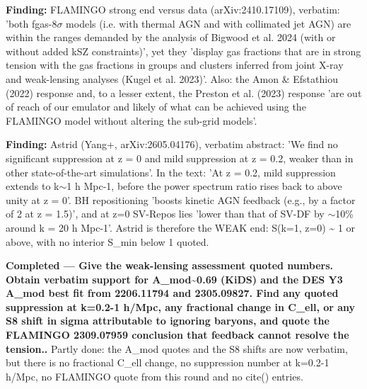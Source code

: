 \documentclass[11pt,a4paper]{article}
\begin{document}
\textbf{Finding:} FLAMINGO strong end versus data (arXiv:2410.17109), verbatim: 'both fgas-8$\sigma$ models (i.e. with thermal AGN and with collimated jet AGN) are within the ranges demanded by the analysis of Bigwood et al. 2024 (with or without added kSZ constraints)', yet they 'display gas fractions that are in strong tension with the gas fractions in groups and clusters inferred from joint X-ray and weak-lensing analyses (Kugel et al. 2023)'. Also: the Amon \& Efstathiou (2022) response and, to a lesser extent, the Preston et al. (2023) response 'are out of reach of our emulator and likely of what can be achieved using the FLAMINGO model without altering the sub-grid models'.

\textbf{Finding:} Astrid (Yang+, arXiv:2605.04176), verbatim abstract: 'We find no significant suppression at z = 0 and mild suppression at z = 0.2, weaker than in other state-of-the-art simulations'. In the text: 'At z = 0.2, mild suppression extends to k$\sim$1 h Mpc-1, before the power spectrum ratio rises back to above unity at z = 0'. BH repositioning 'boosts kinetic AGN feedback (e.g., by a factor of 2 at z = 1.5)', and at z=0 SV-Repos lies 'lower than that of SV-DF by $\sim$10\% around k = 20 h Mpc-1'. Astrid is therefore the WEAK end: S(k=1, z=0) \textasciitilde{} 1 or above, with no interior S\_min below 1 quoted.

\textbf{Completed --- Give the weak-lensing assessment quoted numbers. Obtain verbatim support for A\_mod\textasciitilde{}0.69 (KiDS) and the DES Y3 A\_mod best fit from 2206.11794 and 2305.09827. Find any quoted suppression at k=0.2-1 h/Mpc, any fractional change in C\_ell, or any S8 shift in sigma attributable to ignoring baryons, and quote the FLAMINGO 2309.07959 conclusion that feedback cannot resolve the tension..} Partly done: the A\_mod quotes and the S8 shifts are now verbatim, but there is no fractional C\_ell change, no suppression number at k=0.2-1 h/Mpc, no FLAMINGO quote from this round and no cite() entries.
\end{document}
